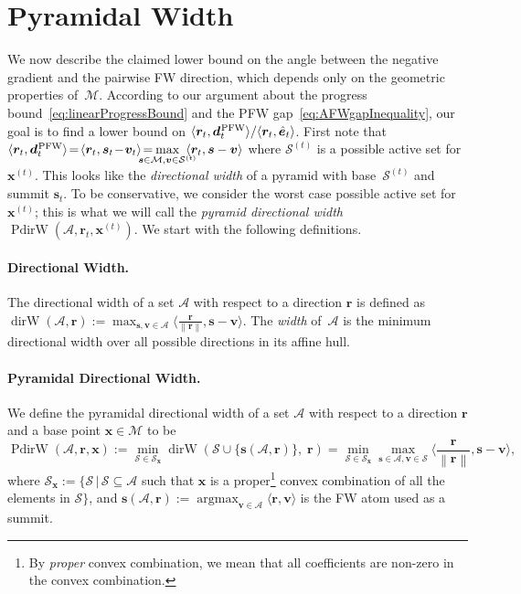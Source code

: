 \documentclass{article} %
\DeclareMathOperator*{\argmax}{\arg\max}
\providecommand{\norm}[1]{\left\lVert#1\right\rVert}
\newcommand{\domain}{\mathcal{M}} %
\newcommand{\PFW}{{\hspace{0.05em}\textnormal{PFW}}}
\newcommand{\dirW}{\mathop{dirW}}
\newcommand{\x}{\bm{x}}
\newcommand{\s}{\bm{s}}
\newcommand{\dd}{\bm{d}}
\newcommand{\vv}{\bm{v}} %
\newcommand{\Vertices}{\mathcal{A}} %
\newcommand{\Coreset}{\mathcal{S}}
\renewcommand{\S}{\mathcal{S}}
\renewcommand{\r}{\bm{r}}
\newcommand{\PdirW}{\mathop{PdirW}}
\newcommand{\innerProdCompressed}[2]{\langle #1 , #2 \rangle}
\newcommand{\err}{\bm{e}} %
\newcommand{\0}{\mathbf{0}} %
\begin{document}
\section{Pyramidal Width} \label{sec:Pwidth}\vspace{-3mm}

We now describe the claimed lower bound on the angle between
the negative gradient and the pairwise FW direction, which depends only on
the geometric properties of~$\domain$. According to our argument about the
progress bound~\eqref{eq:linearProgressBound} and the PFW
gap~\eqref{eq:AFWgapInequality}, our goal is to find a lower bound on
$\innerProdCompressed{\r_t}{\dd_t^\PFW}/\innerProdCompressed{\r_t}{\hat{\err}
_t}$. First note that $\innerProdCompressed{\r_t}{\dd_t^\PFW}\! = \!\innerProdCompressed{\r_t}{\s_t\! -\! \vv_t} \! = \hspace{-5mm}\displaystyle
\max_{\s \in \domain, \vv \in \Coreset^{(t)}}\hspace{-3mm} \innerProdCompressed{\r_t}{\s -
\vv}$ where $\Coreset^{(t)}$ is a possible active set for~$\x^{(t)}$. This
looks like the \emph{directional width} of a pyramid with base~$\Coreset^{(t)}$ 
and summit $\s_t$. To be conservative, we consider the worst
case possible active set for~$\x^{(t)}$; this is what we will call the
\emph{pyramid directional width}~$\PdirW(\Vertices, \r_t, \x^{(t)})$. We 
start with the following definitions.

\vspace{-3mm}
\paragraph{Directional Width.}
The directional width of a set $\Vertices$ with respect to a direction $\r$
is defined as $\dirW(\Vertices,\r) := \max_{\s, \vv \in\Vertices}
\big\langle \frac{\r}{\norm{\r}}, \s - \vv \big\rangle$. The \emph{width} of~$\Vertices$
is the minimum directional width over all possible directions in its affine
hull.

\vspace{-3mm}
\paragraph{Pyramidal Directional Width.} We define the pyramidal directional
width of a set $\Vertices$ with respect to a direction $\r$ and a base point
$\x \in \domain$ to be\vspace{-0.5mm}
\begin{equation} \label{eq:TruePdirW}
\PdirW(\Vertices,\r, \x) := \min_{\S \in \S_{\x}} \dirW( \S \cup
\{\s(\Vertices,\r) \} , \; \r) = \min_{\S \in \S_{\x}} \max_{\s \in
\Vertices, \vv \in \S} \textstyle \big\langle \frac{\r}{\norm{\r}}, \s - \vv \big\rangle
,
\end{equation}
where $\S_{\x} := \{ \S \, | \, \S \subseteq \Vertices$ such that $\x$ is a
proper\footnote{By \emph{proper} convex combination, we mean that all
coefficients are non-zero in the convex combination.} convex combination of
all the elements in $\S\}$, and $\s(\Vertices,\r) := \argmax_{\vv \in
\Vertices} \innerProdCompressed{\r}{\vv}$ is the FW atom used as a summit. 
\end{document}
